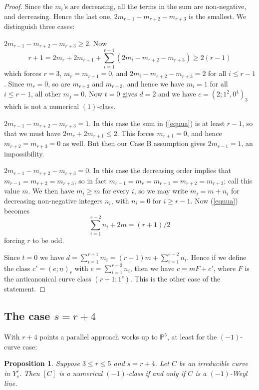 \documentclass[12pt]{article}
\newtheorem{proposition}[equation]{Proposition}
\numberwithin{equation}{section}
\numberwithin{subeq}{equation}
\def\bbP{\mathbb{P}}
\begin{document}
\begin{proof}
Since the $m_i$'s are decreasing,
all the terms in the sum are non-negative, and decreasing.
Hence the last one, $2m_{r-1} - m_{r+2}-m_{r+3}$ is the smallest.
We distinguish three cases:

\medskip{}  $2m_{r-1} - m_{r+2}-m_{r+3} \geq 2$.
Now
\[
r+1 = 2m_r+2m_{r+1} + \sum_{i=1}^{r-1}(2m_i-m_{r+2}-m_{r+3})
\geq 2(r-1)
\]
which forces $r=3$, $m_r=m_{r+1}=0$,
and $2m_i-m_{r+2}-m_{r+3}=2$ for all $i \leq r-1$.
Since $m_r=0$, so are $m_{r+2}$ and $m_{r+3}$,
and hence we have $m_i=1$ for all $i \leq r-1$, all other $m_j=0$.
Now $t=0$ gives $d=2$ and we have $c = (2;1^2,0^4)_3$
which is not a numerical $(1)$-class.



\medskip{} $2m_{r-1} -m_{r+2}-m_{r+3} = 1$.
In this case the sum in (\ref{equua}) is at least $r-1$, so that
we must have $2m_r+2m_{r+1} \leq 2$.
This forces $m_{r+1}=0$, and hence $m_{r+2}=m_{r+3}=0$ as well.
But then our Case B assumption gives $2m_{r-1}=1$, an impossibility.




\medskip{} $2m_{r-1}-m_{r+2}-m_{r+3}=0$.
In this case the decreasing order implies that $m_{r-1}=m_{r+2}=m_{r+3}$,
so in fact $m_{r-1}=m_r=m_{r+1}=m_{r+2}=m_{r+3}$; call this value $m$.
We then have $m_i \geq m$ for every $i$,
so we may write  $m_i = m + n_i$ for decreasing non-negative integers $n_i$,
with $n_i = 0$ for $i \geq r-1$.
Now (\ref{equua}) becomes
\[
\sum_{i=1}^{r-2} n_i + 2m = (r+1)/2
\]
forcing $r$ to be odd.

Since $t=0$ we have $d = \sum_{i=1}^{r+1}m_i = (r+1)m+\sum_{i=1}^{r-2} n_i$.
Hence if we define the class $c' = (e;\underline{n})_r$ with $e = \sum_{i=1}^{r-2}n_i$,
then we have $c = mF + c'$,
where $F$ is the anticanonical curve class $(r+1; 1^s)$.
This is the other case of the statement.
\end{proof}



\subsection{The case $s = r+4$}\label{r+4}

With $r+4$ points a parallel approach works up to $\bbP^5$,
at least for the $(-1)$-curve case:

\begin{proposition}\label{-1classr+4}
Suppose $3 \leq r\leq 5$ and $s=r+4$.
Let $C$ be an irreducible curve in $Y^r_s$.
Then $[C]$ is a numerical $(-1)$-class if and only if $C$ is a $(-1)$-Weyl line.
\end{proposition}
\end{document}
